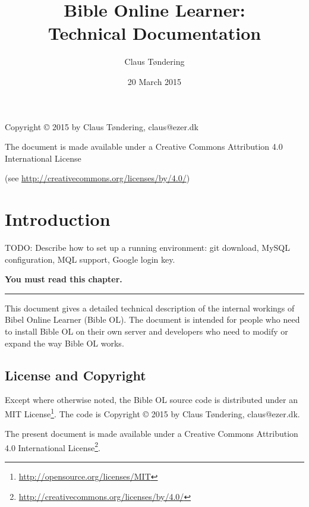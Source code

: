 \documentclass[11pt,oneside,a4paper]{memoir}
\title{Bible Online Learner:\\Technical Documentation}
\author{Claus Tøndering}
\date{20 March 2015}
\begin{document}
\begin{titlingpage*}
\maketitle

\begin{center}
Copyright © 2015 by Claus Tøndering, claus@ezer.dk

\vspace{5mm}

The document is made available under a Creative Commons Attribution 4.0 International License

(see \url{http://creativecommons.org/licenses/by/4.0/})
\end{center}
\end{titlingpage*}


\clearpage
\tableofcontents
{} %

\chapter{Introduction}


TODO: Describe how to set up a running environment: git download, MySQL configuration, MQL support, Google login key.

\textbf{You must read this chapter.}
\plainbreak{3}

This document gives a detailed technical description of the internal workings of Bibel Online
Learner (Bible OL). The document is intended for people who need to install Bible OL on their own
server and developers who need to modify or expand the way Bible OL works.

\section{License and Copyright}

Except where otherwise noted, the Bible OL source code is distributed under an MIT
License\footnote{\url{http://opensource.org/licenses/MIT}}. The code is Copyright © 2015 by Claus
Tøndering, claus@ezer.dk.

The present document is made available under a Creative Commons Attribution 4.0 International License\footnote{\url{http://creativecommons.org/licenses/by/4.0/}}.
\end{document}
